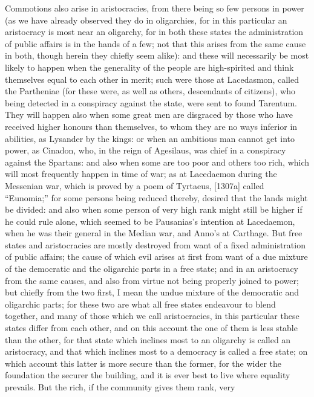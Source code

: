 Commotions also arise in aristocracies, from there being so few persons in
power (as we have already observed they do in oligarchies, for in this
particular an aristocracy is most near an oligarchy, for in both these
states the administration of public affairs is in the hands of a few; not
that this arises from the same cause in both, though herein they chiefly
seem alike): and these will necessarily be most likely to happen when the
generality of the people are high-spirited and think themselves equal to
each other in merit; such were those at Lacedasmon, called the Partheniae
(for these were, as well as others, descendants of citizens), who being
detected in a conspiracy against the state, were sent to found Tarentum.
They will happen also when some great men are disgraced by those who have
received higher honours than themselves, to whom they are no ways inferior
in abilities, as Lysander by the kings: or when an ambitious man cannot
get into power, as Cinadon, who, in the reign of Agesilaus, was chief in a
conspiracy against the Spartans: and also when some are too poor and
others too rich, which will most frequently happen in time of war; as at
Lacedaemon during the Messenian war, which is proved by a poem of
Tyrtaeus, [1307a] called ``Eunomia;'' for some persons being reduced
thereby, desired that the lands might be divided: and also when some
person of very high rank might still be higher if he could rule alone,
which seemed to be Pausanias's intention at Lacedaemon, when he was their
general in the Median war, and Anno's at Carthage. But free states and
aristocracies are mostly destroyed from want of a fixed administration of
public affairs; the cause of which evil arises at first from want of a due
mixture of the democratic and the oligarchic parts in a free state; and in
an aristocracy from the same causes, and also from virtue not being
properly joined to power; but chiefly from the two first, I mean the undue
mixture of the democratic and oligarchic parts; for these two are what all
free states endeavour to blend together, and many of those which we call
aristocracies, in this particular these states differ from each other, and
on this account the one of them is less stable than the other, for that
state which inclines most to an oligarchy is called an aristocracy, and
that which inclines most to a democracy is called a free state; on which
account this latter is more secure than the former, for the wider the
foundation the securer the building, and it is ever best to live where
equality prevails. But the rich, if the community gives them rank, very

